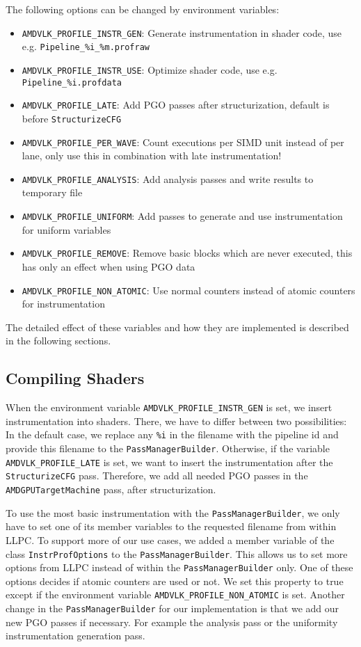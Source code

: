 The following options can be changed by environment variables:
\begin{itemize}
	\item \texttt{AMDVLK\_PROFILE\_INSTR\_GEN}: Generate instrumentation in shader code, use e.g. \texttt{Pipeline\_\%i\_\%m.profraw}
	\item \texttt{AMDVLK\_PROFILE\_INSTR\_USE}: Optimize shader code, use e.g. \texttt{Pipeline\_\%i.profdata}
	\item \texttt{AMDVLK\_PROFILE\_LATE}: Add PGO passes after structurization, default is before \texttt{StructurizeCFG}
	\item \texttt{AMDVLK\_PROFILE\_PER\_WAVE}: Count executions per SIMD unit instead of per lane, only use this in combination with late instrumentation!
	\item \texttt{AMDVLK\_PROFILE\_ANALYSIS}: Add analysis passes and write results to temporary file
	\item \texttt{AMDVLK\_PROFILE\_UNIFORM}: Add passes to generate and use instrumentation for uniform variables
	\item \texttt{AMDVLK\_PROFILE\_REMOVE}: Remove basic blocks which are never executed, this has only an effect when using PGO data
	\item \texttt{AMDVLK\_PROFILE\_NON\_ATOMIC}: Use normal counters instead of atomic counters for instrumentation
\end{itemize}

The detailed effect of these variables and how they are implemented is described in the following sections.

\subsection{Compiling Shaders}
\label{sub:compiling}
When the environment variable \texttt{AMDVLK\_PROFILE\_INSTR\_GEN} is set, we insert instrumentation into shaders. There, we have to differ between two possibilities:
In the default case, we replace any \texttt{\%i} in the filename with the pipeline id and provide this filename to the \texttt{PassManagerBuilder}.
Otherwise, if the variable \texttt{AMDVLK\_PROFILE\_LATE} is set, we want to insert the instrumentation after the \texttt{StructurizeCFG} pass.
Therefore, we add all needed PGO passes in the \texttt{AMDGPUTargetMachine} pass, after structurization.

To use the most basic instrumentation with the \texttt{PassManagerBuilder}, we only have to set one of its member variables to the requested filename from within LLPC.
To support more of our use cases, we added a member variable of the class \texttt{InstrProfOptions} to the \texttt{PassManagerBuilder}.
This allows us to set more options from LLPC instead of within the \texttt{PassManagerBuilder} only.
One of these options decides if atomic counters are used or not.
We set this property to true except if the environment variable \texttt{AMDVLK\_PROFILE\_NON\_ATOMIC} is set.
Another change in the \texttt{PassManagerBuilder} for our implementation is that we add our new PGO passes if necessary.
For example the analysis pass or the uniformity instrumentation generation pass.

